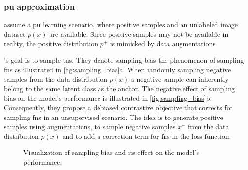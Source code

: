 \subsubsection{\ac{pu} approximation}\label{subsec:pu_approximation}

\citet{chuang_debiased_2020} assume a \ac{pu} learning scenario, 
where positive samples and an unlabeled image dataset $p(x)$ are available.
Since positive samples may not be available in reality, 
the positive distribution $p^+$ is mimicked by data augmentations.

\citeauthor{chuang_debiased_2020}'s goal is to sample \acp{tn}.
They denote sampling bias the phenomenon of sampling \acp{fn} as illustrated in \autoref{fig:sampling_bias}a.
When randomly sampling negative samples from the data distribution $p(x)$ 
a negative sample can inherently belong to the same latent class as the anchor.
The negative effect of sampling bias on the model's performance is illustrated in \autoref{fig:sampling_bias}b. %
Consequently, they propose a debiased contrastive objective that corrects for sampling \acp{fn} 
in an unsupervised scenario.
The idea is to generate positive samples using augmentations,
to sample negative samples $x^-$ from the data distribution $p(x)$
and to add a correction term for \acp{fn} in the loss function. 

\begin{figure}%
    \centering
    \qquad
    \caption{Visualization of sampling bias and its effect on the model's performance.}%
    \label{fig:sampling_bias}%
\end{figure}